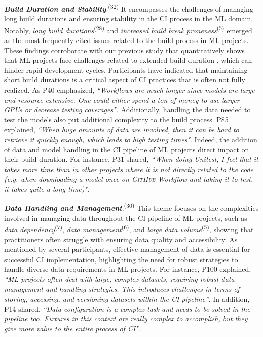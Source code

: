 \textit{\textbf{Build Duration and Stability}}.\textsuperscript{(32)}
It encompasses the challenges of managing long build durations and ensuring stability in the CI process in the ML domain.
Notably, \textit{long build durations}\textsuperscript{(28)} and \textit{increased build break proneness}\textsuperscript{(5)} emerged as the most frequently cited issues related to the build process in ML projects. These findings corroborate with our previous study that quantitatively shows that ML projects face challenges related to extended build duration \citep{bernardo2024machine}, which can hinder rapid development cycles. Participants have indicated that maintaining short build durations is a critical aspect of CI practices that is often not fully realized. 
As P40 emphasized, \textit{``Workflows are much longer since models are large and resource extensive. One could either spend a ton of money to use larger GPUs or decrease testing coverages''}. Additionally, handling the data needed to test the models also put additional complexity to the build process. P85 explained, \textit{``When huge amounts of data are involved, then it can be hard to retrieve it quickly enough, which leads to high testing times"}. Indeed, the addition of data and model handling in the CI pipeline of ML projects direct impact on their build duration. For instance, P31 shared, \textit{``When doing Unitest, I feel that it takes more time than in other projects where it is not directly related to the code (e.g. when downloading a model once on \textsc{GitHub} Workflow and taking it to test, it takes quite a long time)"}.

\textit{\textbf{Data Handling and Management}}.\textsuperscript{(30)}
This theme focuses on the complexities involved in managing data throughout the CI pipeline of ML projects, such as \textit{data dependency}\textsuperscript{(7)}, \textit{data management}\textsuperscript{(6)}, and \textit{large data volume}\textsuperscript{(5)}, showing that practitioners often struggle with ensuring data quality and accessibility. As mentioned by several participants, effective management of data is essential for successful CI implementation, highlighting the need for robust strategies to handle diverse data requirements in ML projects.
For instance, P100 explained, \textit{``ML projects often deal with large, complex datasets, requiring robust data management and handling strategies. This introduces challenges in terms of storing, accessing, and versioning datasets within the CI pipeline''}. In addition, P14 shared, \textit{``Data configuration is a complex task and needs to be solved in the pipeline too. Fixtures in this context are really complex to accomplish, but they give more value to the entire process of CI''}.

